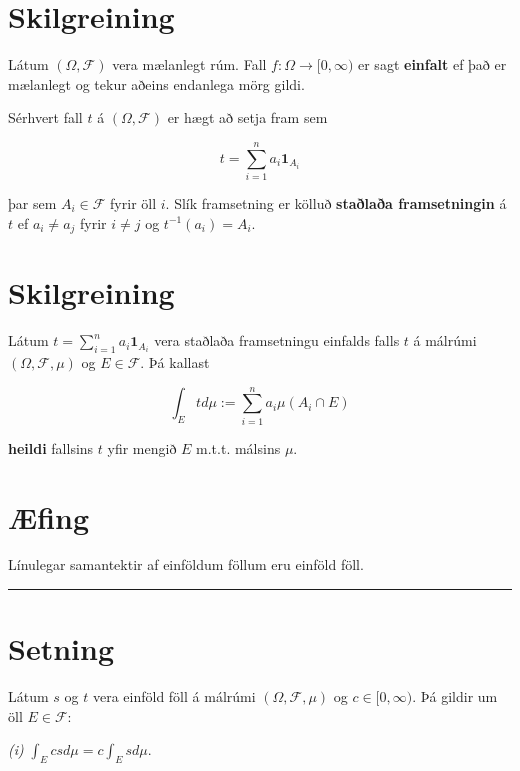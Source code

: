 \documentclass[]{book}
\begin{document}
\hypertarget{skilgreining-19}{%
\section{Skilgreining}\label{skilgreining-19}}

Látum \((\Omega, \mathcal F)\) vera mælanlegt rúm. Fall \(f:\Omega\rightarrow [0,\infty)\) er sagt \textbf{einfalt} ef það er mælanlegt og tekur aðeins endanlega mörg gildi.

Sérhvert fall \(t\) á \((\Omega, \mathcal F)\) er hægt að setja fram sem

\[
t = \sum_{i=1}^n a_i\mathbf{1}_{A_i}
\]

þar sem \(A_i\in\mathcal F\) fyrir öll \(i\). Slík framsetning er kölluð \textbf{staðlaða framsetningin} á \(t\) ef \(a_i\neq a_j\) fyrir \(i\neq j\) og \(t^{-1}(a_i)=A_i\).

\hypertarget{skilgreining-20}{%
\section{Skilgreining}\label{skilgreining-20}}

Látum \(t = \sum_{i=1}^n a_i \mathbf 1_{A_i}\) vera staðlaða framsetningu einfalds falls \(t\) á málrúmi \((\Omega, \mathcal F, \mu)\) og \(E \in \mathcal F\). Þá kallast

\[
\int_E td\mu := \sum_{i=1}^n a_i \mu(A_i\cap E)
\]

\textbf{heildi} fallsins \(t\) yfir mengið \(E\) m.t.t. málsins \(\mu\).

\hypertarget{fing-1}{%
\section{Æfing}\label{fing-1}}

Línulegar samantektir af einföldum föllum eru einföld föll.

\begin{center}\rule{0.5\linewidth}{\linethickness}\end{center}

\hypertarget{setning-43}{%
\section{Setning}\label{setning-43}}

Látum \(s\) og \(t\) vera einföld föll á málrúmi \((\Omega, \mathcal F, \mu)\) og \(c \in [0, \infty)\). Þá gildir um öll \(E \in \mathcal F\):

\emph{(i)} \(\int_E cs d\mu = c\int_Es d\mu\).
\end{document}
